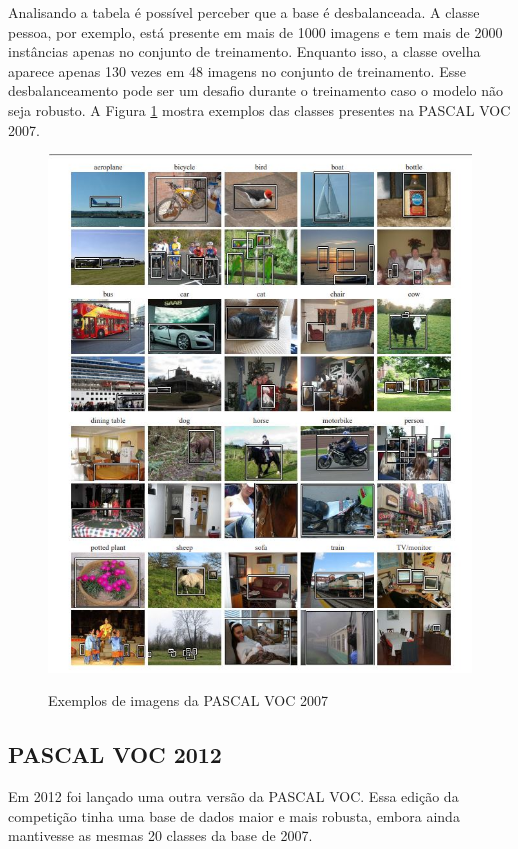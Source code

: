 Analisando a tabela é possível perceber que a base é desbalanceada. A classe pessoa, por exemplo, está presente em mais de 1000 imagens e tem mais de 2000 instâncias apenas no conjunto de treinamento. Enquanto isso, a classe ovelha aparece apenas 130 vezes em 48 imagens no conjunto de treinamento. Esse desbalanceamento pode ser um desafio durante o treinamento caso o modelo não seja robusto. A Figura \ref{fig:pascal2007} mostra exemplos das classes presentes na \ac{PASCAL VOC} 2007.

\begin{figure}[H]
	\setlength{\abovecaptionskip}{0pt}
	\setlength{\belowcaptionskip}{0pt}
	\caption[Imagens PASCAL VOC 2007]{Exemplos de imagens da PASCAL VOC 2007}
	\centering
	\includegraphics[width=.9\textwidth]{imagem/0x_pascal2007.jpg}
	\captionsetup{justification=centering}
	\label{fig:pascal2007}
\end{figure}

\subsection{PASCAL VOC 2012}
\label{section:3:4:1}

Em 2012 foi lançado uma outra versão da \ac{PASCAL VOC}. Essa edição da competição tinha uma base de dados maior e mais robusta, embora ainda mantivesse as mesmas 20 classes da base de 2007.